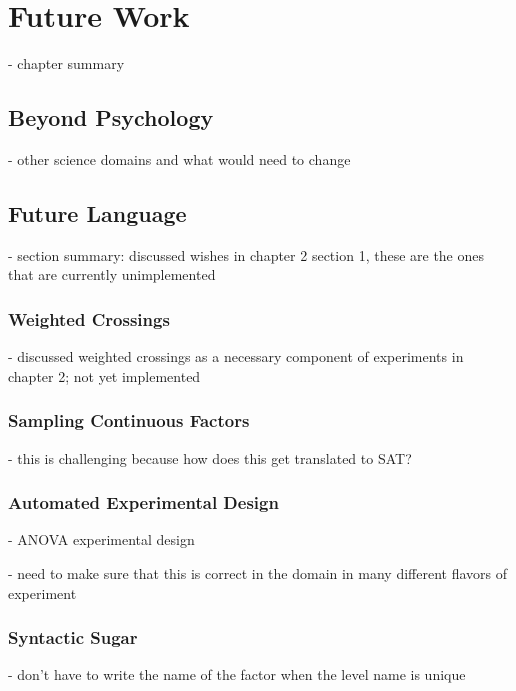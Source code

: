 \chapter{Future Work}

- chapter summary

\section{Beyond Psychology}

- other science domains and what would need to change

\section{Future Language}

- section summary: discussed wishes in chapter 2 section 1, these are the ones that are currently unimplemented

\subsection{Weighted Crossings}

- discussed weighted crossings as a necessary component of experiments in chapter 2; not yet implemented

\subsection{Sampling Continuous Factors}

- this is challenging because how does this get translated to SAT?

\subsection{Automated Experimental Design}

- ANOVA experimental design

- need to make sure that this is correct in the domain in many different flavors of experiment

\subsection{Syntactic Sugar}

- don't have to write the name of the factor when the level name is unique

